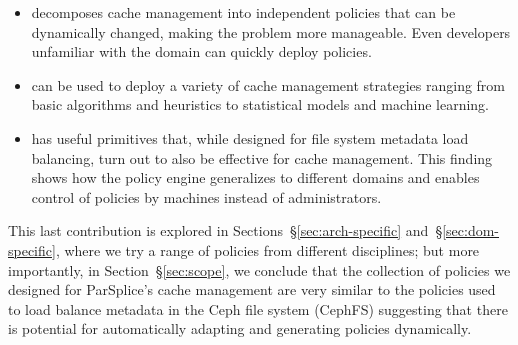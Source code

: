 \begin{itemize}

  \item decomposes cache management into independent policies that can be
  dynamically changed, making the problem more manageable. Even developers
  unfamiliar with the domain can quickly deploy policies.

  \item can be used to deploy a variety of cache management strategies ranging
  from basic algorithms and heuristics to statistical models and machine
  learning. 

  \item has useful primitives that, while designed for file system metadata
  load balancing, turn out to also be effective for cache management. This
  finding shows how the policy engine generalizes to different domains and
  enables control of policies by machines instead of administrators.

\end{itemize}


This last contribution is explored in Sections~\S\ref{sec:arch-specific}
and~\S\ref{sec:dom-specific}, where we try a range of policies from different
disciplines; but more importantly, in Section~\S\ref{sec:scope}, we conclude
that the collection of policies we designed for ParSplice's cache management
are very similar to the policies used to load balance metadata in the Ceph file
system (CephFS) suggesting that there is potential for automatically adapting
and generating policies dynamically. 


